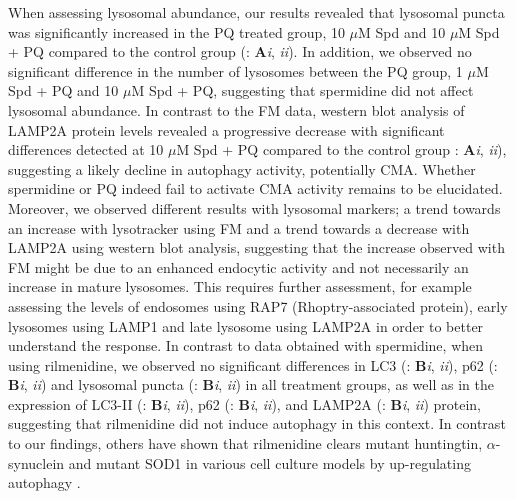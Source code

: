 When assessing lysosomal abundance, our results revealed that lysosomal puncta was significantly increased in the PQ treated group, 10 $\mu$M Spd and 10 $\mu$M Spd + PQ compared to the control group (: \textbf{A}\textit{i}, \textit{ii}). In addition, we observed no significant difference in the number of lysosomes between the PQ group, 1 $\mu$M Spd + PQ and 10 $\mu$M Spd + PQ, suggesting that spermidine did not affect  lysosomal abundance. In contrast to the FM data, western blot analysis of LAMP2A protein levels revealed a progressive decrease with significant differences detected at 10 $\mu$M Spd + PQ compared to the control group : \textbf{A}\textit{i}, \textit{ii}), suggesting a likely decline in autophagy activity, potentially CMA. Whether spermidine or PQ indeed fail to activate CMA activity remains to be elucidated. Moreover, we observed different results with lysosomal markers; a trend towards an increase with lysotracker using FM and a trend towards a decrease with LAMP2A using western blot analysis, suggesting that the increase observed with FM might be due to an enhanced endocytic activity and not necessarily an increase in mature lysosomes. This requires further assessment, for example assessing the levels of endosomes using RAP7 (Rhoptry-associated protein), early lysosomes using LAMP1 and late lysosome using LAMP2A in order to better understand the response. In contrast to data obtained with spermidine, when using rilmenidine, we observed no significant differences in LC3 (: \textbf{B}\textit{i}, \textit{ii}), p62 (: \textbf{B}\textit{i}, \textit{ii}) and lysosomal puncta (: \textbf{B}\textit{i}, \textit{ii}) in all treatment groups, as well as in the expression of LC3-II (: \textbf{B}\textit{i}, \textit{ii}), p62 (: \textbf{B}\textit{i}, \textit{ii}), and LAMP2A  (: \textbf{B}\textit{i}, \textit{ii}) protein, suggesting that rilmenidine did not induce autophagy in this context. In contrast to our findings, others have shown that rilmenidine clears mutant huntingtin, $\alpha$-synuclein and mutant SOD1 in various cell culture models by up-regulating autophagy \citep{Rose2010,Perera2018,Williams2008}. 

